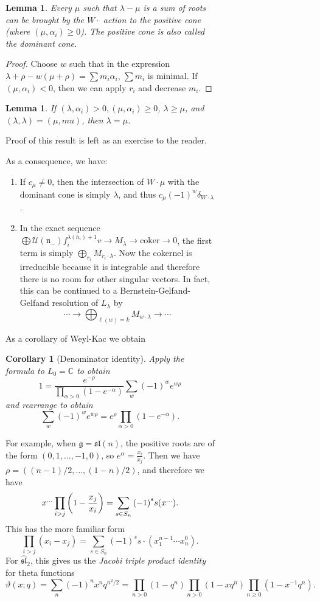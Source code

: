 \documentclass[leqno, openany]{memoir}
\newtheorem{cor}[thm]{Corollary}
\newtheorem{lem}[thm]{Lemma}
\theoremstyle{definition}
\theoremstyle{remark}
\theoremstyle{plain}
\theoremstyle{definition}
\theoremstyle{remark}
\newcommand{\C}{\mathbb{C}}
\newcommand{\mc}[1]{\mathcal{#1}}
\newcommand{\mf}[1]{\mathfrak{#1}}
\newcommand{\mr}[1]{\mathrm{#1}}
\newcommand{\wh}[1]{\widehat{#1}}
\begin{document}
\begin{figure}[H]
\begin{figure}[H]
\begin{lem} Every $\mu$ such that $\lambda - \mu$ is a sum of roots can be
brought by the $W \cdot$ action to the positive cone (where $(\mu,\alpha_i)
\geq 0$). The positive cone is also called the dominant cone.  \end{lem}

\begin{proof} Choose $w$ such that in the expression $\lambda + \rho - w(\mu +
\rho) = \sum m_i \alpha_i$, $\sum m_i$ is minimal. If $(\mu, \alpha_i) < 0$,
then we can apply $r_i$ and decrease $m_i$.  \end{proof}

\begin{lem} If $(\lambda, \alpha_i) > 0, (\mu, \alpha_i) \geq 0$, $\lambda \geq
\mu$, and $(\lambda, \lambda) = (\mu, mu)$, then $\lambda = \mu$.  \end{lem}

Proof of this result is left as an exercise to the reader.

As a consequence, we have: \begin{enumerate} \item If $c_{\mu} \neq 0$, then
    the intersection of $W \cdot \mu$ with the dominant cone is simply
    $\lambda$, and thus $c_{\mu} {(-1)}^w \delta_{W \cdot \lambda}$.  \item In
    the exact sequence $\bigoplus \mc{U}(\mf{n}_-) f_i^{\lambda(h_i)+1} v \to
    M_{\lambda} \to \mr{coker} \to 0$, the first term is simply
    $\bigoplus_{r_i} M_{r_i \cdot \lambda}$. Now the cokernel is irreducible
    because it is integrable and therefore there is no room for other singular
    vectors. In fact, this can be continued to a Bernstein-Gelfand-Gelfand
    resolution of $L_{\lambda}$ by \[ \cdots \to \bigoplus_{\ell(w)=k} M_{w
\cdot \lambda} \to \cdots \] \end{enumerate}

As a corollary of Weyl-Kac we obtain \begin{cor}[Denominator identity] Apply
    the formula to $L_0 = \C$ to obtain \[ 1 = \frac{e^{-\rho}}{\prod_{\alpha >
        0} (1-e^{-\alpha})} \sum_w {(-1)}^w e^{w \rho} \] and rearrange to
        obtain \[ \sum_w {(-1)}^w e^{w \rho} = e^{\rho} \prod_{\alpha > 0}
        (1-e^{-\alpha}). \] \end{cor}

For example, when $\mf{g} = \mf{sl}(n)$, the positive roots are of the form
$(0, 1, \ldots, -1, 0)$, so $e^{\alpha} = \frac{x_i}{x_j}$. Then we have $\rho
= ((n-1)/2, \ldots, (1-n)/2)$, and therefore we have \[ x^{\ldots} \prod_{i >
j} \qty(1-\frac{x_j}{x_i}) = \sum_{s \in S_n} {(-1)}^s s(x^{\ldots}). \] This
has the more familiar form \[ \prod_{i > j} (x_i - x_j) = \sum_{s\in S_n}
{(-1)}^s s \cdot (x_1^{n-1} \cdots x_n^0). \] For $\wh{\mf{sl}}_2$, this gives
us the \textit{Jacobi triple product identity} for theta functions \[
\vartheta(x;q) = \sum_n {(-1)}^n x^n q^{n^2/2} = \prod_{n > 0} (1-q^n)
\prod_{n>0} (1-xq^n) \prod_{n \geq 0} (1-x^{-1} q^n). \]


\end{figure}
\end{figure}
\end{document}
